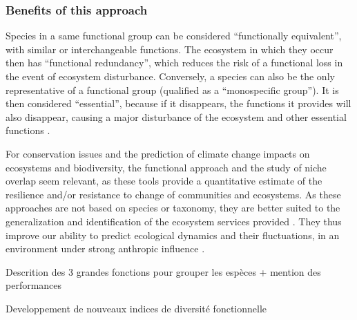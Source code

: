 \subsubsection{Benefits of this approach}

Species in a same functional group can be considered ``functionally equivalent'', with similar or interchangeable functions. The ecosystem in which they occur then has ``functional redundancy'', which reduces the risk of a functional loss in the event of ecosystem disturbance. Conversely, a species can also be the only representative of a functional group (qualified as a ``monospecific group''). It is then considered ``essential'', because if it disappears, the functions it provides will also disappear, causing a major disturbance of the ecosystem and other essential functions \citep{mejri2009}. 

For conservation issues and the prediction of climate change impacts on ecosystems and biodiversity, the functional approach and the study of niche overlap seem relevant, as these tools provide a quantitative estimate of the resilience and/or resistance to change of communities and ecosystems. As these approaches are not based on species or taxonomy, they are better suited to the generalization and identification of the ecosystem services provided \citep{martini2020,mcgill2006}. They thus improve our ability to predict ecological dynamics and their fluctuations, in an environment under strong anthropic influence \citep{kremer2017}.


Descrition des 3 grandes fonctions pour grouper les espèces + mention des performances 

Developpement de nouveaux indices de diversité fonctionnelle 

